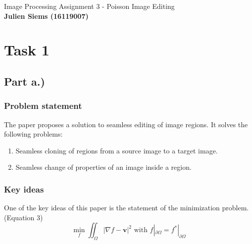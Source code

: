 \documentclass[]{book}
\theoremstyle{definition}
\begin{document}


\begin{center}
{\Large Image Processing \hspace{0.5cm} Assignment 3 - Poisson Image Editing}\\
\textbf{Julien Siems (16119007)}\\ %
\end{center}

\vspace{0.2 cm}
\section*{Task 1}
\subsection*{Part a.)}
\subsubsection*{Problem statement}
The paper proposes a solution to seamless editing of image regions. 
It solves the following problems:
\begin{enumerate}
\item Seamless cloning of regions from a source image to a target image.
\item Seamless change of properties of an image inside a region.
\end{enumerate}


\subsubsection*{Key ideas}
One of the key ideas of this paper is the statement of the minimization problem. (Equation 3)
\begin{equation}
\min_f \iint_{\Omega} |\nabla f - \mathbf{v}|^2 \text{ with } f|_{\partial \Omega} = f^*|_{\partial \Omega}
\end{equation}
\end{document}
